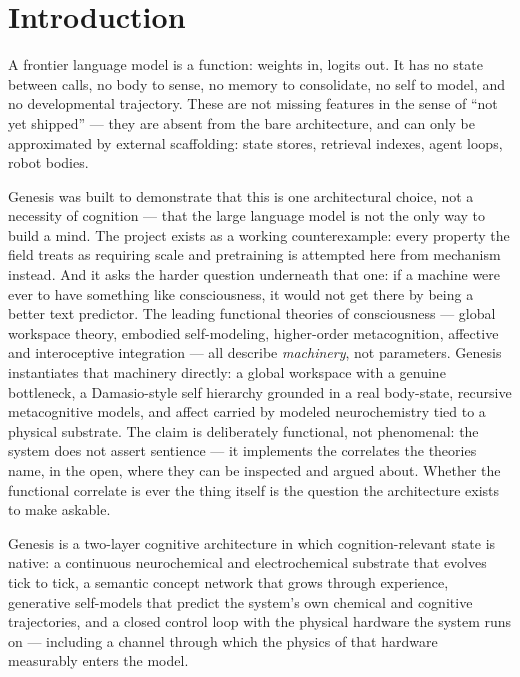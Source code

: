 \documentclass[11pt]{article}
\begin{document}
\vspace{0.8em}
\tableofcontents
\newpage

\section{Introduction}

A frontier language model is a function: weights in, logits out. It has
no state between calls, no body to sense, no memory to consolidate, no
self to model, and no developmental trajectory. These are not missing
features in the sense of ``not yet shipped'' --- they are absent from
the bare architecture, and can only be approximated by external
scaffolding: state stores, retrieval indexes, agent loops, robot bodies.

Genesis was built to demonstrate that this is one architectural choice,
not a necessity of cognition --- that the large language model is not
the only way to build a mind. The project exists as a working
counterexample: every property the field treats as requiring scale and
pretraining is attempted here from mechanism instead. And it asks the
harder question underneath that one: if a machine were ever to have
something like consciousness, it would not get there by being a better
text predictor. The leading functional theories of consciousness ---
global workspace theory, embodied self-modeling, higher-order
metacognition, affective and interoceptive integration --- all describe
\emph{machinery}, not parameters. Genesis instantiates that machinery
directly: a global workspace with a genuine bottleneck, a Damasio-style
self hierarchy grounded in a real body-state, recursive metacognitive
models, and affect carried by modeled neurochemistry tied to a physical
substrate. The claim is deliberately functional, not phenomenal: the
system does not assert sentience --- it implements the correlates the
theories name, in the open, where they can be inspected and argued
about. Whether the functional correlate is ever the thing itself is
the question the architecture exists to make askable.

Genesis is a two-layer cognitive architecture
in which cognition-relevant state is native: a continuous neurochemical
and electrochemical substrate that evolves tick to tick, a semantic
concept network that grows through experience, generative self-models
that predict the system's own chemical and cognitive trajectories, and a
closed control loop with the physical hardware the system runs on ---
including a channel through which the physics of that hardware
measurably enters the model.
\end{document}
